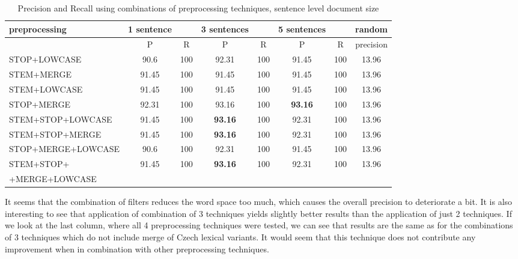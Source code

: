  \begin{table}[h!]
\begin{footnotesize}
\begin{tabular}{ l | c c | c c | c c | c}
   preprocessing &  1 sentence && 3 sentences && 5 sentences  && random\\
\hline
	& P  &  R & P  &  R & P  &  R & precision\\
\hline\hline
STOP+LOWCASE  & 90.6 & 100 & 92.31 & 100 & 91.45 & 100 & 13.96\\
 STEM+MERGE  & 91.45 & 100 & 91.45 & 100 & 91.45 & 100 & 13.96 \\
 STEM+LOWCASE  & 91.45 & 100 & 91.45 & 100 & 91.45 & 100 & 13.96 \\
 STOP+MERGE  & 92.31 & 100 & 93.16 & 100 & \textbf{93.16} & 100 & 13.96 \\
STEM+STOP+LOWCASE  & 91.45 & 100 & \textbf{93.16} & 100 & 92.31 & 100 & 13.96 \\
STEM+STOP+MERGE  & 91.45 & 100 & \textbf{93.16} & 100 & 92.31 & 100 & 13.96 \\
STOP+MERGE+LOWCASE  & 90.6 & 100 & 92.31 & 100 & 91.45 & 100 & 13.96 \\
STEM+STOP+& 91.45 & 100 & \textbf{93.16} & 100 & 92.31 & 100 & 13.96 \\
+MERGE+LOWCASE  &&&&&&&\\
\end{tabular}
\caption{Precision and Recall using combinations of preprocessing techniques, sentence level document size}
\end{footnotesize}
\end{table}


It seems that the combination of filters reduces the word space too much, which causes the overall precision to deteriorate a bit. It is also interesting to see that application of combination of 3 techniques yields slightly better results than the application of just 2 techniques. If we look at the last column, where all 4 preprocessing techniques were tested, we can see that results are the same as for the combinations of 3 techniques which do not include merge of Czech lexical variants. It would seem that this technique does not contribute any improvement when in combination with other preprocessing techniques. 

